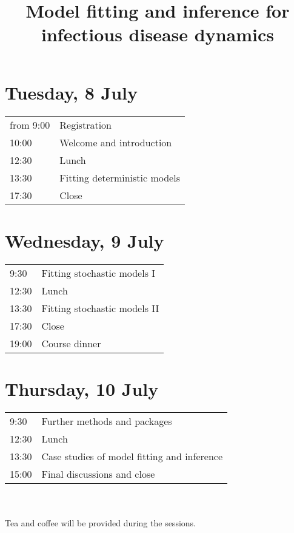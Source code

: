 \documentclass[a4paper]{article}
\title{Model fitting and inference for\\infectious disease dynamics}
\author{}
\date{}
\begin{document}
\maketitle

\section*{Tuesday, 8 July}
\label{sec:tuesday}

\begin{tabular}{R{1.5cm} l}
from 9:00 & Registration\\
10:00 & Welcome and introduction\\
12:30 & Lunch\\
13:30 & Fitting deterministic models\\
17:30 & Close\\
\end{tabular}

\section*{Wednesday, 9 July}
\label{sec:wednesday}
\begin{tabular}{R{1.5cm} l}
9:30 & Fitting stochastic models I\\
12:30 & Lunch\\
13:30 & Fitting stochastic models II\\
17:30 & Close\\
19:00 & Course dinner\\
\end{tabular}

\section*{Thursday, 10 July}
\label{sec:thursday}
\begin{tabular}{R{1.5cm} l}
9:30 & Further methods and packages\\
12:30 & Lunch\\
13:30 & Case studies of model fitting and inference\\
15:00 & Final discussions and close\\
\end{tabular}\\
\vspace{0.5cm}\\
Tea and coffee will be provided during the sessions.
\end{document}
